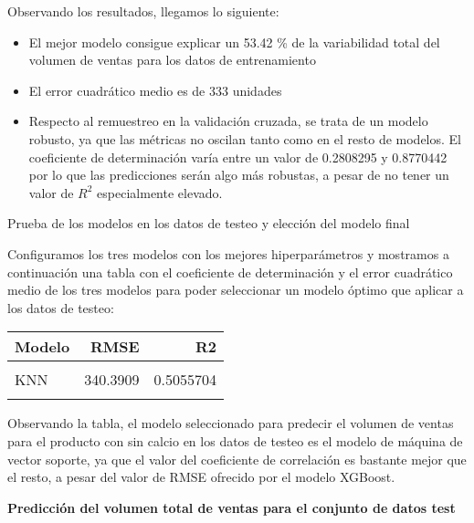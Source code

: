 \documentclass[
]{article}
\providecommand{\tightlist}{%
  \setlength{\itemsep}{0pt}\setlength{\parskip}{0pt}}
\begin{document}
Observando los resultados, llegamos lo siguiente:

\begin{itemize}
\tightlist
\item
  El mejor modelo consigue explicar un 53.42 \% de la variabilidad total
  del volumen de ventas para los datos de entrenamiento
\item
  El error cuadrático medio es de 333 unidades
\item
  Respecto al remuestreo en la validación cruzada, se trata de un modelo
  robusto, ya que las métricas no oscilan tanto como en el resto de
  modelos. El coeficiente de determinación varía entre un valor de
  0.2808295 y 0.8770442 por lo que las predicciones serán algo más
  robustas, a pesar de no tener un valor de \(R^2\) especialmente
  elevado.
\end{itemize}

Prueba de los modelos en los datos de testeo y elección del modelo final

Configuramos los tres modelos con los mejores hiperparámetros y
mostramos a continuación una tabla con el coeficiente de determinación y
el error cuadrático medio de los tres modelos para poder seleccionar un
modelo óptimo que aplicar a los datos de testeo:

\begin{table}[H]
\centering
\begin{tabular}{lrr}
\toprule
Modelo & RMSE & R2\\
\midrule
\cellcolor{gray!6}{SVM} & \cellcolor{gray!6}{309.0547} & \cellcolor{gray!6}{0.5716225}\\
KNN & 340.3909 & 0.5055704\\
\cellcolor{gray!6}{XGBoost} & \cellcolor{gray!6}{211.6134} & \cellcolor{gray!6}{0.5234797}\\
\bottomrule
\end{tabular}
\end{table}

Observando la tabla, el modelo seleccionado para predecir el volumen de
ventas para el producto con sin calcio en los datos de testeo es el
modelo de máquina de vector soporte, ya que el valor del coeficiente de
correlación es bastante mejor que el resto, a pesar del valor de RMSE
ofrecido por el modelo XGBoost.

\textbf{Predicción del volumen total de ventas para el conjunto de datos
test}
\end{document}
